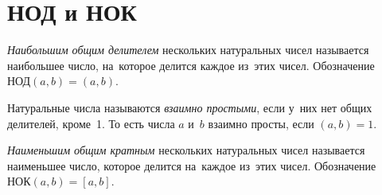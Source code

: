 
\section*{НОД и НОК}





\emph{Наибольшим общим делителем} нескольких натуральных чисел называется
наибольшее число, на~которое делится каждое из~этих чисел.
Обозначение $\text{НОД}(a, b) = (a, b)$.

Натуральные числа называются \emph{взаимно простыми}, если у~них нет общих
делителей, кроме~1.
То есть числа $a$ и~$b$ взаимно просты, если $(a, b) = 1$.

\emph{Наименьшим общим кратным} нескольких натуральных чисел называется
наименьшее число, которое делится на~каждое из~этих чисел.
Обозначение $\text{НОК}(a, b) = [a, b]$.

